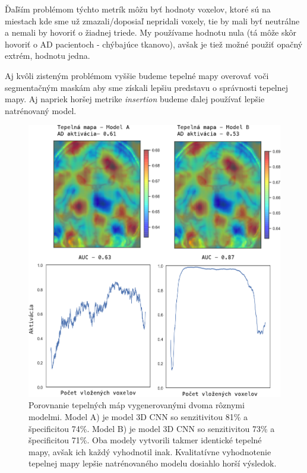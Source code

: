 Ďaľším problémom týchto metrík môžu byť hodnoty voxelov, ktoré sú na miestach kde sme už zmazali/doposiaľ nepridali voxely, tie by mali byť neutrálne a nemali by hovoriť o žiadnej triede. My používame hodnotu nula (tá môže skôr hovoriť o AD pacientoch - chýbajúce tkanovo), avšak je tiež možné použiť opačný extrém, hodnotu jedna.

Aj kvôli zisteným problémom vyššie budeme tepelné mapy overovať voči segmentačným maskám aby sme získali lepšiu predstavu o správnosti tepelnej mapy. Aj napriek horšej metrike \textit{insertion} budeme ďalej používať lepšie natrénovaný model.

\begin{figure}[h!]
    \centering
    \includegraphics[width=14cm]{assets/images/3d_cnn_heatmap_cmp.png}
    \caption{Porovnanie tepelných máp vygenerovanými dvoma rôznymi modelmi. Model A) je model 3D CNN so senzitivitou 81\% a špecificitou 74\%. Model B) je model 3D CNN so senzitivitou 73\% a špecificitou 71\%. Oba modely vytvorili takmer identické tepelné mapy, avšak ich každý vyhodnotil inak. Kvalitatívne vyhodnotenie tepelnej mapy lepšie natrénovaného modelu dosiahlo horší výsledok.}
    \label{fig:3d_cnn_heatmap_cmp}
\end{figure}

